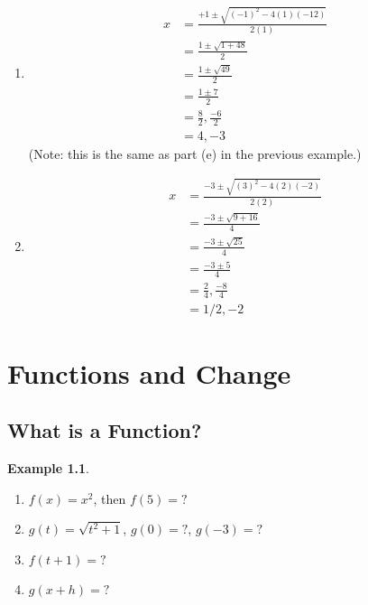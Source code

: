 \documentclass[oneside]{book}
\theoremstyle{definition}
\newtheorem{example}{Example}
\theoremstyle{solution}
\newtheorem*{solution}{Solution}
\newenvironment{solution}{\vspace{2in}\comment}{\endcomment}
\begin{document}
\begin{solution}
\begin{enumerate}
\item 
\begin{align*}
x & = \frac{+1 \pm \sqrt{(-1)^2 -4(1)(-12)}}{2(1)}\\
  & = \frac{1 \pm \sqrt{1+48}}{2}\\
  & = \frac{1 \pm \sqrt{49}}{2}\\
  & = \frac{1 \pm 7}{2}\\
  & = \frac{8}{2}, \frac{-6}{2}\\
  & = 4, -3
\end{align*}
(Note: this is the same as part (e) in the previous example.)

\item 
\begin{align*}
x & = \frac{-3 \pm \sqrt{(3)^2 -4(2)(-2)}}{2(2)}\\
  & = \frac{-3 \pm \sqrt{9+16}}{4}\\
  & = \frac{-3 \pm \sqrt{25}}{4}\\
  & = \frac{-3 \pm 5}{4}\\
  & = \frac{2}{4}, \frac{-8}{4}\\
  & = 1/2, -2
\end{align*}
\end{enumerate}
\end{solution}


\chapter{Functions and Change}
\section{What is a Function?}

\begin{example}
\begin{enumerate}
\item $f(x) = x^2$, then $f(5) = ?$
\item $g(t) = \sqrt{t^2 + 1}$, \qquad $g(0) = ?$, \qquad $g(-3) = ?$
\item $f(t+1) = ?$
\item $g(x + h) = ?$
\end{enumerate}
\end{example}
\end{document}
